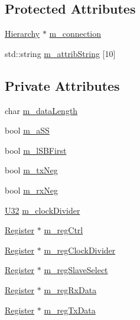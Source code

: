 \subsection*{Protected Attributes}
\begin{DoxyCompactItemize}
\item 
\hyperlink{classHierarchy}{Hierarchy} $\ast$ \hyperlink{classElement_abe3de7a5dbbc9a6dd2d7e012e5fdb266}{m\+\_\+connection}
\item 
std\+::string \hyperlink{classAttrib_a3414521d7a82476e874b25a5407b5e63}{m\+\_\+attrib\+String} \mbox{[}10\mbox{]}
\end{DoxyCompactItemize}
\subsection*{Private Attributes}
\begin{DoxyCompactItemize}
\item 
char \hyperlink{classUsbSpiBus_a2d8b2bddd6d4d5dc53c38b5698737c5c}{m\+\_\+data\+Length}
\item 
bool \hyperlink{classUsbSpiBus_ac98d088ac8aed042f65cbd918fc538ae}{m\+\_\+a\+SS}
\item 
bool \hyperlink{classUsbSpiBus_a23011787b0425356b011bc7a1c7cff5b}{m\+\_\+l\+S\+B\+First}
\item 
bool \hyperlink{classUsbSpiBus_a48528e7dcb036ecc1732581a89e16d10}{m\+\_\+tx\+Neg}
\item 
bool \hyperlink{classUsbSpiBus_abf36f2df24c3ec5363efe73c9771bbc8}{m\+\_\+rx\+Neg}
\item 
\hyperlink{classUsbSpiBus_a9b24e28662a35ca57f5ed32c41c5f3ff}{U32} \hyperlink{classUsbSpiBus_a5a4de2b61018f52b885559ce07bd3161}{m\+\_\+clock\+Divider}
\item 
\hyperlink{classRegister}{Register} $\ast$ \hyperlink{classUsbSpiBus_abcd2ac59f2bb4ea5b97ff98f2b7659da}{m\+\_\+reg\+Ctrl}
\item 
\hyperlink{classRegister}{Register} $\ast$ \hyperlink{classUsbSpiBus_abfd5f040a0a8c19d972b26ea581bf1f0}{m\+\_\+reg\+Clock\+Divider}
\item 
\hyperlink{classRegister}{Register} $\ast$ \hyperlink{classUsbSpiBus_a5cdebdc06a79322c0802fbc523cade91}{m\+\_\+reg\+Slave\+Select}
\item 
\hyperlink{classRegister}{Register} $\ast$ \hyperlink{classUsbSpiBus_ab59fb8ae67f97818d8cc6e0daf324cf6}{m\+\_\+reg\+Rx\+Data}
\item 
\hyperlink{classRegister}{Register} $\ast$ \hyperlink{classUsbSpiBus_ae4b9ec4d035b9a507735b28dba04556c}{m\+\_\+reg\+Tx\+Data}
\end{DoxyCompactItemize}


